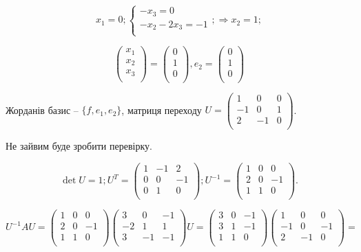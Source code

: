 $$x_1 = 0; \left\{\begin{matrix}
	-x_3 = 0 \\
	-x_2 - 2x_3 = -1 \\
\end{matrix} \right.; \Rightarrow x_2 = 1;$$

$$\begin{pmatrix}
	x_1 \\
	x_2 \\
	x_3 \\
\end{pmatrix} = \begin{pmatrix}
	0 \\
	1 \\
	0 \\
\end{pmatrix}, e_2 = \begin{pmatrix}
	0 \\
	1 \\
	0 \\
\end{pmatrix}$$

Жорданів базис -- $\{f, e_1, e_2\}$, матриця переходу $U = \begin{pmatrix}
	 1 &  0 & 0 \\
	-1 &  0 & 1 \\
	 2 & -1 & 0 \\
\end{pmatrix}$.

Не зайвим буде зробити перевірку.

$$\det U = 1; U^{T} = \begin{pmatrix}
	1 & -1 & 2 \\
	0 & 0  & -1 \\
	0 & 1  & 0 \\
\end{pmatrix}; U^{-1} = \begin{pmatrix}
	1 & 0 & 0 \\
	2 & 0 & -1 \\
	1 & 1 & 0 \\
\end{pmatrix}. $$

$$U^{-1} A U = \begin{pmatrix}
	1 & 0 & 0 \\
	2 & 0 & -1 \\
	1 & 1 & 0 \\
\end{pmatrix} \begin{pmatrix}
	3  & 0  & -1 \\
	-2 & 1  &  1 \\
	3  & -1 & -1 \\
\end{pmatrix} U = \begin{pmatrix}
	3 & 0 & -1 \\
	3 & 1 & -1 \\
	1 & 1 & 0  \\
\end{pmatrix} \begin{pmatrix}
	1  & 0  & 0  \\
	-1 & 0  & -1 \\
	2  & -1 & 0  \\
\end{pmatrix}  = $$


